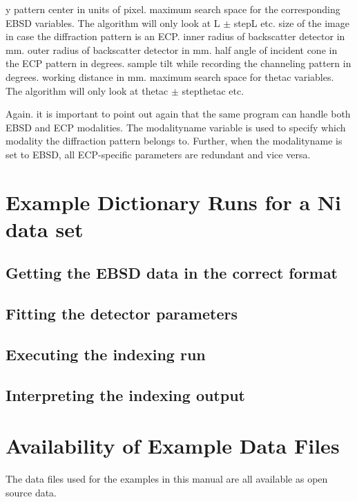\documentclass[DIV=calc, paper=letter, fontsize=11pt]{scrartcl}	 %
\begin{document}
\begin{itemize}
	 y pattern center in units of pixel.
	 maximum search space for the corresponding EBSD variables. The algorithm will only look at \textsf{L} $\pm$ \textsf{step\textunderscore L} etc.
	 size of the image in case the diffraction pattern is an ECP.
	 inner radius of backscatter detector in mm.
	 outer radius of backscatter detector in mm.
	 half angle of incident cone in the ECP pattern in degrees.
	 sample tilt while recording the channeling pattern in degrees.
	 working distance in mm.
	 maximum search space for \textsf{thetac} variables. The algorithm will only look at \textsf{thetac} $\pm$ \textsf{step\textunderscore thetac} etc.
\end{itemize}
Again. it is important to point out again that the same program can handle both EBSD and ECP modalities. The \textsf{modalityname} variable is used to specify which modality the diffraction pattern belongs to. Further, when the \textsf{modalityname} is set to EBSD, all ECP-specific parameters are redundant and vice versa.


\section{Example Dictionary Runs for a Ni data set}

\subsection{Getting the EBSD data in the correct format}

\subsection{Fitting the detector parameters}

\subsection{Executing the indexing run}


\subsection{Interpreting the indexing output}






\section{Availability of Example Data Files\label{sec:datafiles}}
The data files used for the examples in this manual are all available as open source data.



\clearpage


\end{document}
